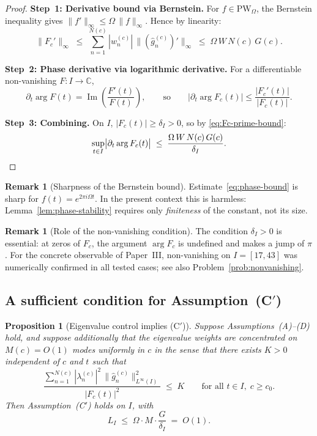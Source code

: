 \documentclass[12pt,a4paper]{amsart}
\newtheorem{proposition}[theorem]{Proposition}
\theoremstyle{definition}
\newtheorem{remark}[theorem]{Remark}
\newcommand{\PW}{\mathrm{PW}_\Omega}
\begin{document}
\begin{proof}
\textbf{Step~1: Derivative bound via Bernstein.}
For $f \in \PW$, the Bernstein inequality gives
$\|f'\|_\infty \le \Omega\,\|f\|_\infty$.
Hence by linearity:
\begin{equation}
\|F_c'\|_\infty
\;\le\;
\sum_{n=1}^{N(c)} |w_n^{(c)}|\,
\bigl\|(\widehat{g}_n^{(c)})'\bigr\|_\infty
\;\le\; \Omega\,W\,N(c)\,G(c).
\label{eq:Fc-prime-bound}
\end{equation}

\textbf{Step~2: Phase derivative via logarithmic
derivative.}
For a differentiable non-vanishing
$F : I \to \mathbb{C}$,
\[
\partial_t \arg F(t)
= \operatorname{Im}\!\left(
\frac{F'(t)}{F(t)}\right),
\qquad\text{so}\qquad
\bigl|\partial_t \arg F_c(t)\bigr|
\le \frac{|F_c'(t)|}{|F_c(t)|}.
\]

\textbf{Step~3: Combining.}
On $I$, $|F_c(t)| \ge \delta_I > 0$, so by
\eqref{eq:Fc-prime-bound}:
\[
\sup_{t \in I}
\bigl|\partial_t \arg F_c(t)\bigr|
\;\le\;
\frac{\Omega\,W\,N(c)\,G(c)}{\delta_I}.
\qedhere
\]
\end{proof}

\begin{remark}[Sharpness of the Bernstein bound]
\label{rem:bernstein-sharp}
Estimate~\eqref{eq:phase-bound} is sharp for
$f(t) = e^{2\pi i\Omega t}$. In the present context
this is harmless: Lemma~\ref{lem:phase-stability}
requires only \emph{finiteness} of the constant,
not its size.
\end{remark}

\begin{remark}[Role of the non-vanishing condition]
\label{rem:nondeg}
The condition $\delta_I > 0$ is essential: at zeros
of $F_c$, the argument $\arg F_c$ is undefined and
makes a jump of $\pi$. For the concrete observable
of Paper~III, non-vanishing on $I = [17,43]$ was
numerically confirmed in all tested cases; see also
Problem~\ref{prob:nonvanishing}.
\end{remark}

\subsection{A sufficient condition for
Assumption~\texorpdfstring{(C$'$)}{(C')}}
\label{ssec:cprime-sufficient}

\begin{proposition}[Eigenvalue control implies (C$'$)]
\label{prop:cprime-sufficient}
Suppose Assumptions~(A)--(D) hold, and suppose
additionally that the eigenvalue weights are concentrated
on $M(c) = O(1)$ modes uniformly in $c$ in the sense
that there exists $K > 0$ independent of $c$ and $t$
such that
\[
\frac{\displaystyle
\sum_{n=1}^{N(c)} |\lambda_n^{(c)}|^2\,
\|\widehat{g}_n^{(c)}\|_{L^\infty(I)}^2}
{|F_c(t)|^2}
\;\le\; K
\qquad\text{for all } t \in I,\; c \ge c_0.
\]
Then Assumption~(C$'$) holds on $I$, with
\[
L_I \;\le\; \Omega \cdot M \cdot
\frac{G}{\delta_I} \;=\; O(1).
\]
\end{proposition}
\end{document}
